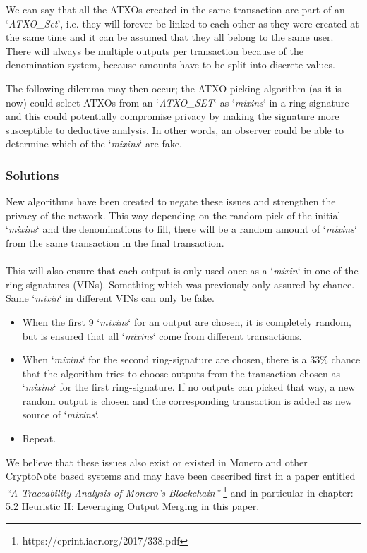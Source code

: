 We can say that all the ATXOs created in the same transaction are part
of an ‘\textit{ATXO\_Set}’, i.e. they will forever be linked to each
other as they were created at the same time and it can be assumed that
they all belong to the same user. There will always be multiple outputs
per transaction because of the denomination system, because amounts
have to be split into discrete values.


\noindent
The following dilemma may then occur; the ATXO picking algorithm (as it is
now) could select ATXOs from an ‘\textit{ATXO\_SET}‘ as ‘\textit{mixins}‘
in a ring-signature and this could potentially compromise privacy by making
the signature more susceptible to deductive analysis. In other words, an
observer could be able to determine which of the ‘\textit{mixins}‘ are fake.



\subsubsection{Solutions}
New algorithms have been created to negate these issues and strengthen the
privacy of the network. This way depending on the random pick of the initial
‘\textit{mixins}‘ and the denominations to fill, there will be a random
amount of ‘\textit{mixins}‘ from the same transaction in the final transaction.
\\
\\
\noindent
This will also ensure that each output is only used once as a ‘\textit{mixin}‘
in one of the ring-signatures (VINs). Something which was previously only
assured by chance. Same ‘\textit{mixin}‘ in different VINs can only be fake.



\begin{itemize}
	\item When the first 9 ‘\textit{mixins}‘ for an output are chosen, it is
	completely random, but is ensured that all ‘\textit{mixins}‘ come from
	different transactions.
	\item When ‘\textit{mixins}‘ for the second ring-signature are chosen,
	there is a 33\% chance that the algorithm tries to 	choose outputs from
	the transaction chosen as ‘\textit{mixins}‘ for the first ring-signature.
	If no outputs can 	picked that way, a new random output is chosen and
	the corresponding transaction is added as new source of ‘\textit{mixins}‘.
	\item Repeat.
\end{itemize}


\noindent
We believe that these issues also exist or existed in Monero and other CryptoNote based
systems and may have been described first in a paper entitled
\textit{“A Traceability Analysis of Monero’s Blockchain”}
\footnote{https://eprint.iacr.org/2017/338.pdf} and in particular in
chapter: 5.2 Heuristic II: Leveraging Output Merging in this paper.
